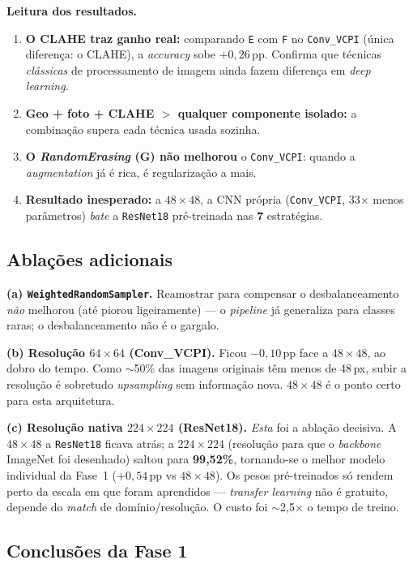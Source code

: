 \documentclass[11pt,a4paper]{article}
\begin{document}
\textbf{Leitura dos resultados.}
\begin{enumerate}[nosep]
  \item \textbf{O CLAHE traz ganho real:} comparando \texttt{E} com \texttt{F} no
  \texttt{Conv\_VCPI} (única diferença: o CLAHE), a \emph{accuracy} sobe $+0{,}26$\,pp.
  Confirma que técnicas \emph{clássicas} de processamento de imagem ainda fazem diferença
  em \emph{deep learning}.
  \item \textbf{Geo + foto + CLAHE $>$ qualquer componente isolado:} a combinação supera
  cada técnica usada sozinha.
  \item \textbf{O \emph{RandomErasing} (G) não melhorou} o \texttt{Conv\_VCPI}: quando a
  \emph{augmentation} já é rica, é regularização a mais.
  \item \textbf{Resultado inesperado:} a $48\times48$, a CNN própria
  (\texttt{Conv\_VCPI}, 33$\times$ menos parâmetros) \emph{bate} a \texttt{ResNet18}
  pré-treinada nas \textbf{7} estratégias.
\end{enumerate}

\subsection{Ablações adicionais}
\label{sec:res}

\textbf{(a) \texttt{WeightedRandomSampler}.} Reamostrar para compensar o desbalanceamento
\emph{não} melhorou (até piorou ligeiramente) --- o \emph{pipeline} já generaliza para
classes raras; o desbalanceamento não é o gargalo.

\textbf{(b) Resolução $64\times64$ (Conv\_VCPI).} Ficou $-0{,}10$\,pp face a $48\times48$,
ao dobro do tempo. Como $\sim$50\% das imagens originais têm menos de 48\,px, subir a
resolução é sobretudo \emph{upsampling} sem informação nova. $48\times48$ é o ponto certo
para esta arquitetura.

\textbf{(c) Resolução nativa $224\times224$ (ResNet18).} \emph{Esta} foi a ablação
decisiva. A $48\times48$ a \texttt{ResNet18} ficava atrás; a $224\times224$ (resolução
para que o \emph{backbone} ImageNet foi desenhado) saltou para \textbf{99{,}52\%},
tornando-se o melhor modelo individual da Fase~1 ($+0{,}54$\,pp vs $48\times48$). Os pesos
pré-treinados só rendem perto da escala em que foram aprendidos --- \emph{transfer
learning} não é gratuito, depende do \emph{match} de domínio/resolução. O custo foi
$\sim$2{,}5$\times$ o tempo de treino.

\subsection{Conclusões da Fase 1}
\end{document}
